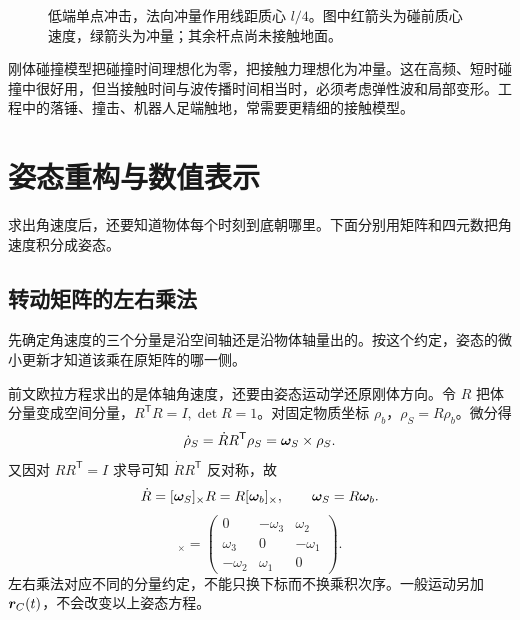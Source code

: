 \begin{figure}[htbp]
\centering
{}
\caption{低端单点冲击，法向冲量作用线距质心 $l/4$。图中红箭头为碰前质心速度，绿箭头为冲量；其余杆点尚未接触地面。}
\label{fig:rigid-impact}
\end{figure}


\begin{remark}
刚体碰撞模型把碰撞时间理想化为零，把接触力理想化为冲量。这在高频、短时碰撞中很好用，但当接触时间与波传播时间相当时，必须考虑弹性波和局部变形。工程中的落锤、撞击、机器人足端触地，常需要更精细的接触模型。
\end{remark}

\section{姿态重构与数值表示}
求出角速度后，还要知道物体每个时刻到底朝哪里。下面分别用矩阵和四元数把角速度积分成姿态。

\subsection{转动矩阵的左右乘法}
先确定角速度的三个分量是沿空间轴还是沿物体轴量出的。按这个约定，姿态的微小更新才知道该乘在原矩阵的哪一侧。

前文欧拉方程求出的是体轴角速度，还要由姿态运动学还原刚体方向。令 $R$ 把体分量变成空间分量，$R^{\mathsf T}R=I,\det R=1$。对固定物质坐标 $\rho_b$，$\rho_S=R\rho_b$。微分得
\[
\dot\rho_S=\dot RR^{\mathsf T}\rho_S=\boldsymbol{\omega}_S\times\rho_S.
\]
又因对 $RR^{\mathsf T}=I$ 求导可知 $\dot RR^{\mathsf T}$ 反对称，故
\begin{equation}
\dot R=[\boldsymbol{\omega}_S]_\times R=R[\boldsymbol{\omega}_b]_\times,\qquad \boldsymbol{\omega}_S=R\boldsymbol{\omega}_b.
\label{eq:rotation-matrix-kinematics}
\end{equation}
\begin{equation}
[\bom]_\times=\begin{pmatrix}0&-\omega_3&\omega_2\\\omega_3&0&-\omega_1\\-\omega_2&\omega_1&0\end{pmatrix}.
\label{eq:rotation-matrix-body}
\end{equation}
左右乘法对应不同的分量约定，不能只换下标而不换乘积次序。一般运动另加 $\boldsymbol{r}_C(t)$，不会改变以上姿态方程。

